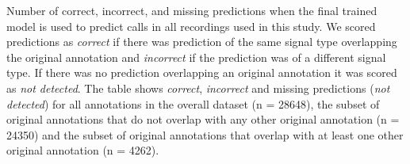 \documentclass[11pt]{article}
\begin{document}
\pagestyle{empty}
\begin{table}[h]
    \centering
    \caption{Number of correct, incorrect, and missing predictions when the final
        trained model is used to predict calls in all recordings used in this study.
        We scored predictions as
        \emph{correct} if there was prediction of the same signal type overlapping
        the original annotation and
        \emph{incorrect} if the prediction was of a different signal type.
        If there was no prediction overlapping an original annotation it was
        scored as \emph{not detected}.
        The table shows \emph{correct}, \emph{incorrect} and missing predictions
        (\emph{not detected}) for all annotations in the overall dataset (n = 28648),
        the subset of original annotations that do not overlap with any other
        original annotation (n = 24350) and the subset of original annotations
        that overlap with at least one other original annotation (n = 4262).}
    \small
    
\end{table}
\end{document}
